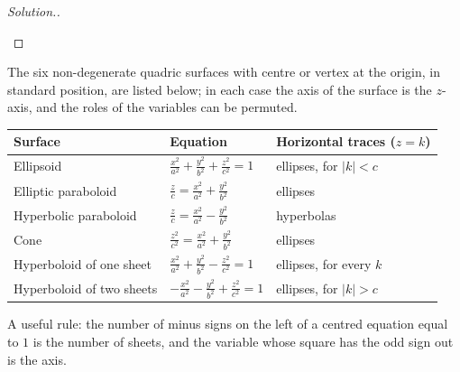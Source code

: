 \documentclass[11pt,a4paper]{article}
\theoremstyle{definition}
\newenvironment{solution}
  {\renewcommand{\qedsymbol}{}\begin{proof}[\textit{Solution}.]}
  {\end{proof}}
\begin{document}
\begin{solution}
\begin{figure}[H]
\centering
{}
\end{figure}
\end{solution}

The six non-degenerate quadric surfaces with centre or vertex at the origin, in
standard position, are listed below; in each case the axis of the surface is the
$z$-axis, and the roles of the variables can be permuted.
\begin{center}
\begin{tabular}{lll}
\hline
Surface & Equation & Horizontal traces ($z = k$)\\
\hline
Ellipsoid & $\frac{x^2}{a^2} + \frac{y^2}{b^2} + \frac{z^2}{c^2} = 1$ & ellipses, for
$|k|<c$\\[1ex]
Elliptic paraboloid & $\frac{z}{c} = \frac{x^2}{a^2} + \frac{y^2}{b^2}$ & ellipses\\[1ex]
Hyperbolic paraboloid & $\frac{z}{c} = \frac{x^2}{a^2} - \frac{y^2}{b^2}$ & hyperbolas\\[1ex]
Cone & $\frac{z^2}{c^2} = \frac{x^2}{a^2} + \frac{y^2}{b^2}$ & ellipses\\[1ex]
Hyperboloid of one sheet & $\frac{x^2}{a^2} + \frac{y^2}{b^2} - \frac{z^2}{c^2} = 1$
& ellipses, for every $k$\\[1ex]
Hyperboloid of two sheets & $-\frac{x^2}{a^2} - \frac{y^2}{b^2} + \frac{z^2}{c^2} =
1$ & ellipses, for $|k|>c$\\
\hline
\end{tabular}
\end{center}
A useful rule: the number of minus signs on the left of a centred equation
equal to $1$ is the number of sheets, and the variable whose square has the odd
sign out is the axis.
\end{document}
